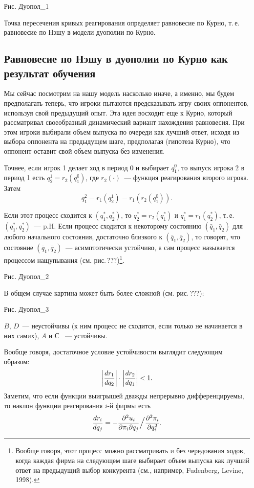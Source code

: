 {Рис. Дуопол_1


Точка пересечения кривых реагирования определяет равновесие по
Курно, т.\,е.  равновесие по Нэшу в модели дуополии по Курно.

\subsection{Равновесие по Нэшу в дуополии по Курно как результат обучения}

Мы сейчас посмотрим на нашу модель насколько иначе, а именно, мы
будем предполагать теперь, что игроки пытаются предсказывать игру
своих оппонентов, используя свой предыдущий опыт. Эта идея восходит
еще к Курно, который рассматривал своеобразный динамический вариант
нахождения равновесия. При этом игроки выбирали объем выпуска по
очереди как лучший ответ,  исходя из выбора оппонента на предыдущем
шаге, предполагая (гипотеза Курно), что  оппонент оставит свой объем
выпуска без изменения.

Точнее, если игрок 1 делает ход в период $0$ и выбирает $q^0_1$, то
выпуск игрока 2 в период 1 есть $q^1_2=r_2(q^0_1)$, где
$r_2(\cdot)$~--- функция реагирования второго игрока. Затем
$$
q^2_1=r_1(q^1_2)=r_1(r_2(q^0_1)).
$$

Если этот процесс сходится к $(q^*_1,q^*_2)$, то $q^*_2=r_2(q^*_1)$
и $q^*_1=r_1(q^*_2)$, т.\,е. $(q^*_1,q^*_2)$~--- p.H. Если процесс
сходится к некоторому состоянию $(\bar q_1,\bar q_2)$ для любого
начального состояния, достаточно близкого к $(\bar q_1,\bar q_2)$,
то говорят, что
состояние $(\bar q_1,\bar q_2)$~--- асимптотически устойчиво, а сам
процесс называется процессом нащупывания (см. рис.\,???)\footnote{
Вообще говоря, этот процесс можно рассматривать и без чередования
ходов, когда каждая фирма на следующем шаге выбирает объем выпуска
как лучший ответ на предыдущий выбор конкурента (см., например,
Fudenberg, Levine, 1998).}.


Рис. Дуопол_2


В общем случае картина может быть более сложной (см. рис.\,???):

Рис. Дуопол_3

$B$, $D$~--- неустойчивы  (к ним процесс не сходится, если
только не начинается   в них самих), $A$ и $С$ ~--- устойчивы.

Вообще говоря, достаточное условие устойчивости выглядит следующим
образом:
$$
\biggl |{dr_1\over dq_2}\biggr |\cdot\biggl |{dr_2\over dq_1}\biggr
|<1.
$$
Заметим, что если функции выигрышей дважды непрерывно
дифференцируемы, то наклон функции реагирования $i$-й фирмы есть
$$
{dr_i\over dq_j}=-{\partial^2 u_i\over{\partial\pi_i\partial
q_j}}\Big /{{\partial^2\pi_i}\over{\partial q^2_i}}.
$$

}
